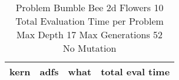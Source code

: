 \begin{table}[H]
\caption{Problem  Bumble Bee 2d  Flowers 10\\Total Evaluation Time per Problem \\ Max Depth 17 Max Generations 52\\ No Mutation \\}
\begin{center}
\scalebox{1.0} %
{
\begin{tabular}{lllr}
\hline
kern & adfs & what & total eval time \\
\hline


\end{tabular}
}
\end{center}
\end{table}

